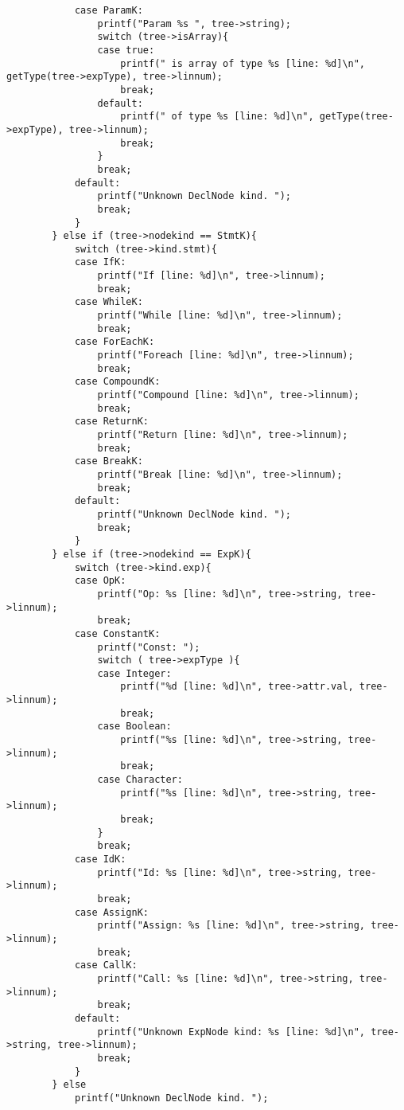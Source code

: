 \documentclass[12pt]{book}
\begin{document}
\begin{lstlisting}
            case ParamK:
                printf("Param %s ", tree->string);
                switch (tree->isArray){
                case true:
                    printf(" is array of type %s [line: %d]\n", getType(tree->expType), tree->linnum);
                    break;
                default:
                    printf(" of type %s [line: %d]\n", getType(tree->expType), tree->linnum);
                    break;
                }
                break;
            default: 
                printf("Unknown DeclNode kind. ");
                break;
            }
        } else if (tree->nodekind == StmtK){    
            switch (tree->kind.stmt){
            case IfK:
                printf("If [line: %d]\n", tree->linnum);
                break;
            case WhileK:
                printf("While [line: %d]\n", tree->linnum);
                break;
            case ForEachK:
                printf("Foreach [line: %d]\n", tree->linnum);
                break;
            case CompoundK:
                printf("Compound [line: %d]\n", tree->linnum);
                break;
            case ReturnK:
                printf("Return [line: %d]\n", tree->linnum);
                break;
            case BreakK:
                printf("Break [line: %d]\n", tree->linnum);
                break;
            default:
                printf("Unknown DeclNode kind. ");
                break;
            }
        } else if (tree->nodekind == ExpK){   
            switch (tree->kind.exp){
            case OpK:
                printf("Op: %s [line: %d]\n", tree->string, tree->linnum);
                break;
            case ConstantK:
                printf("Const: ");
                switch ( tree->expType ){
                case Integer:
                    printf("%d [line: %d]\n", tree->attr.val, tree->linnum);
                    break;
                case Boolean:
                    printf("%s [line: %d]\n", tree->string, tree->linnum);
                    break;
                case Character:
                    printf("%s [line: %d]\n", tree->string, tree->linnum);
                    break;
                }
                break;
            case IdK:
                printf("Id: %s [line: %d]\n", tree->string, tree->linnum);
                break;
            case AssignK:
                printf("Assign: %s [line: %d]\n", tree->string, tree->linnum);
                break;
            case CallK:
                printf("Call: %s [line: %d]\n", tree->string, tree->linnum);
                break;
            default:
                printf("Unknown ExpNode kind: %s [line: %d]\n", tree->string, tree->linnum);
                break;
            }
        } else
            printf("Unknown DeclNode kind. ");


\end{lstlisting}
\end{document}
